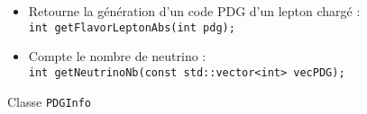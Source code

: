 \begin{figure}[!ht]
\begin{description}
\begin{itemize}
			\item Retourne la génération d'un code PDG d'un lepton chargé :\\
\verb|int getFlavorLeptonAbs(int pdg);|

			\item Compte le nombre de neutrino :\\
\verb|int getNeutrinoNb(const std::vector<int> vecPDG);|

	\end{itemize}
	\end{description}
	
	\caption{Classe \texttt{PDGInfo}}
	\label{tab:PDGInfo}
\end{figure}